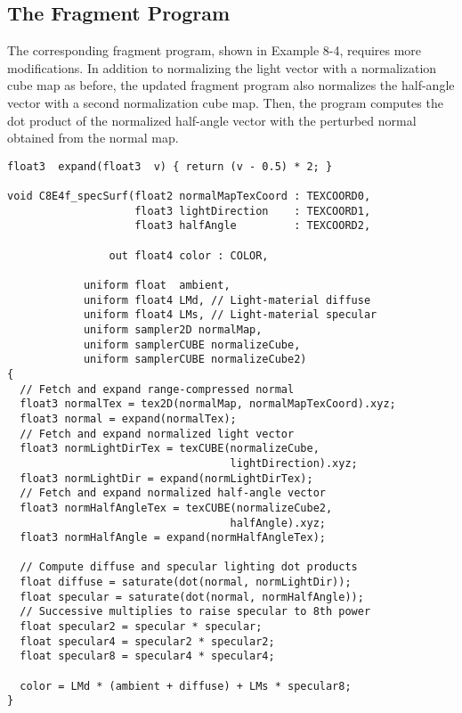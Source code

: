 \documentclass[../main.tex]{subfiles}
\begin{document}
\subsection*{The Fragment Program}

The corresponding fragment program, shown in Example 8-4, requires more modifications. In addition to normalizing the light vector with a normalization cube map as before, the updated fragment program also normalizes the half-angle vector with a second normalization cube map. Then, the program computes the dot product of the normalized half-angle vector with the perturbed normal obtained from the normal map.

\FloatBarrier
\begin{lstlisting}[caption=Example 8-4. The \textbf{C8E4f_specSurf} Fragment Program]
float3  expand(float3  v) { return (v - 0.5) * 2; }

void C8E4f_specSurf(float2 normalMapTexCoord : TEXCOORD0,
                    float3 lightDirection    : TEXCOORD1,
                    float3 halfAngle         : TEXCOORD2,

                out float4 color : COLOR,

            uniform float  ambient,
            uniform float4 LMd, // Light-material diffuse
            uniform float4 LMs, // Light-material specular
            uniform sampler2D normalMap,
            uniform samplerCUBE normalizeCube,
            uniform samplerCUBE normalizeCube2)
{
  // Fetch and expand range-compressed normal
  float3 normalTex = tex2D(normalMap, normalMapTexCoord).xyz;
  float3 normal = expand(normalTex);
  // Fetch and expand normalized light vector
  float3 normLightDirTex = texCUBE(normalizeCube,
                                   lightDirection).xyz;
  float3 normLightDir = expand(normLightDirTex);
  // Fetch and expand normalized half-angle vector
  float3 normHalfAngleTex = texCUBE(normalizeCube2,
                                   halfAngle).xyz;
  float3 normHalfAngle = expand(normHalfAngleTex);

  // Compute diffuse and specular lighting dot products
  float diffuse = saturate(dot(normal, normLightDir));
  float specular = saturate(dot(normal, normHalfAngle));
  // Successive multiplies to raise specular to 8th power
  float specular2 = specular * specular;
  float specular4 = specular2 * specular2;
  float specular8 = specular4 * specular4;

  color = LMd * (ambient + diffuse) + LMs * specular8;
}
\end{lstlisting}
\FloatBarrier
\end{document}
